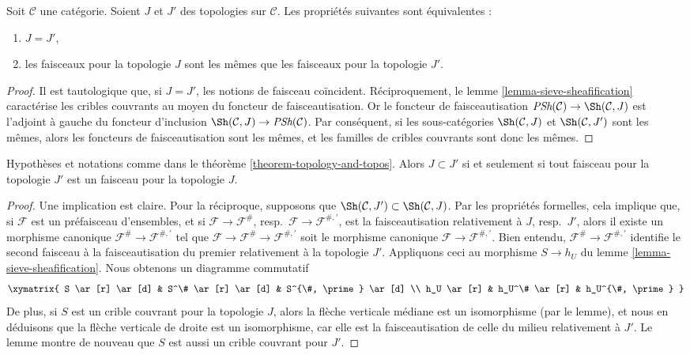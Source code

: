\begin{theorem}
\label{theorem-topology-and-topos}
Soit $\mathcal{C}$ une catégorie.
Soient $J$ et $J'$ des topologies sur $\mathcal{C}$.
Les propriétés suivantes sont équivalentes :
\begin{enumerate}
\item $J = J'$,
\item les faisceaux pour la topologie $J$ sont les mêmes que
les faisceaux pour la topologie $J'$.
\end{enumerate}
\end{theorem}

\begin{proof}
Il est tautologique que, si $J = J'$, les notions de faisceau
coïncident. Réciproquement, le lemme \ref{lemma-sieve-sheafification}
caractérise les cribles couvrants au moyen du foncteur de faisceautisation.
Or le foncteur de faisceautisation
$\textit{PSh}(\mathcal{C}) \to \Sh(\mathcal{C}, J)$
est l'adjoint à gauche du foncteur d'inclusion
$\Sh(\mathcal{C}, J) \to \textit{PSh}(\mathcal{C})$.
Par conséquent, si les sous-catégories
$\Sh(\mathcal{C}, J)$ et
$\Sh(\mathcal{C}, J')$ sont les mêmes, alors les foncteurs de faisceautisation
sont les mêmes, et les familles de cribles couvrants sont donc
les mêmes.
\end{proof}

\begin{lemma}
\label{lemma-finer-topology}
Hypothèses et notations comme dans le théorème \ref{theorem-topology-and-topos}.
Alors $J \subset J'$ si et seulement si tout faisceau pour la
topologie $J'$ est un faisceau pour la topologie $J$.
\end{lemma}

\begin{proof}
Une implication est claire. Pour la réciproque, supposons que
$\Sh(\mathcal{C}, J') \subset \Sh(\mathcal{C}, J)$.
Par les propriétés formelles, cela implique
que, si $\mathcal{F}$ est un préfaisceau d'ensembles,
et si $\mathcal{F} \to \mathcal{F}^\#$,
resp.\ $\mathcal{F} \to \mathcal{F}^{\#, \prime}$,
est la faisceautisation relativement à $J$, resp.\ $J'$, alors il existe
un morphisme canonique $\mathcal{F}^\# \to \mathcal{F}^{\#, \prime}$
tel que
$\mathcal{F} \to \mathcal{F}^\# \to \mathcal{F}^{\#, \prime}$
soit le morphisme canonique $\mathcal{F} \to \mathcal{F}^{\#, \prime}$.
Bien entendu, $\mathcal{F}^\# \to \mathcal{F}^{\#, \prime}$
identifie le second faisceau à la faisceautisation du premier
relativement à la topologie $J'$.
Appliquons ceci au morphisme $S \to h_U$ du
lemme \ref{lemma-sieve-sheafification}. Nous obtenons un diagramme
commutatif
$$
\xymatrix{
S \ar[r] \ar[d] &
S^\# \ar[r] \ar[d] &
S^{\#, \prime} \ar[d] \\
h_U \ar[r] &
h_U^\# \ar[r] &
h_U^{\#, \prime}
}
$$
De plus, si $S$ est un crible couvrant pour la topologie $J$,
alors la flèche verticale médiane est un isomorphisme (par le lemme),
et nous en déduisons que la flèche verticale de droite est un isomorphisme,
car elle est la faisceautisation de celle du milieu relativement à $J'$.
Le lemme montre de nouveau que $S$ est aussi un crible couvrant
pour $J'$.
\end{proof}




